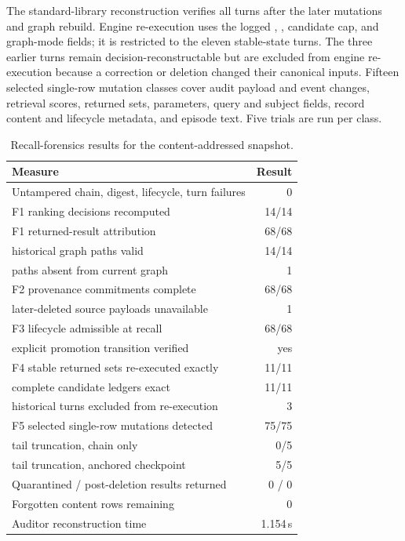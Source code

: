 The standard-library reconstruction verifies all turns after the later
mutations and graph rebuild. Engine re-execution uses the logged
, , candidate cap, and graph-mode fields; it is
restricted to the eleven stable-state turns. The three earlier turns remain
decision-reconstructable but are excluded from engine re-execution because a
correction or deletion changed their canonical inputs. Fifteen selected
single-row mutation classes cover audit payload and event changes, retrieval
scores, returned sets, parameters, query and subject fields, record content
and lifecycle metadata, and episode text. Five trials are run per class.

\begin{table}[t]
\centering
\caption{Recall-forensics results for the content-addressed snapshot.}
\label{tab:forensics}
\small
\begin{tabularx}{\columnwidth}{@{}Yr@{}}
\toprule
Measure & Result \\
\midrule
Untampered chain, digest, lifecycle, turn failures & 0 \\
F1 ranking decisions recomputed & 14/14 \\
F1 returned-result attribution & 68/68 \\
\quad historical graph paths valid & 14/14 \\
\quad paths absent from current graph & 1 \\
F2 provenance commitments complete & 68/68 \\
\quad later-deleted source payloads unavailable & 1 \\
F3 lifecycle admissible at recall & 68/68 \\
\quad explicit promotion transition verified & yes \\
F4 stable returned sets re-executed exactly & 11/11 \\
\quad complete candidate ledgers exact & 11/11 \\
\quad historical turns excluded from re-execution & 3 \\
F5 selected single-row mutations detected & 75/75 \\
\quad tail truncation, chain only & 0/5 \\
\quad tail truncation, anchored checkpoint & 5/5 \\
Quarantined / post-deletion results returned & 0 / 0 \\
Forgotten content rows remaining & 0 \\
Auditor reconstruction time & 1.154\,s \\
\bottomrule
\end{tabularx}
\end{table}

